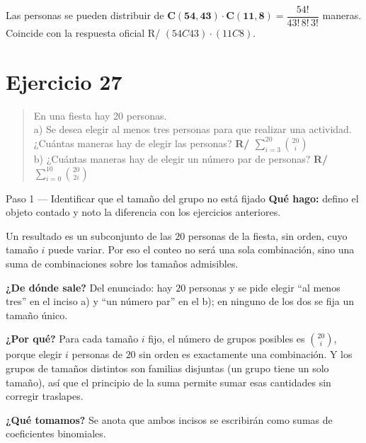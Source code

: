 \documentclass[11pt]{article}
\begin{document}
\begin{resp}
Las personas se pueden distribuir de $\mathbf{C(54,43)\cdot C(11,8)}=\dfrac{54!}{43!\,8!\,3!}$ maneras. Coincide con la respuesta oficial R/ $(54C43)\cdot(11C8)$.
\end{resp}

\section*{Ejercicio 27}

\begin{quote}
En una fiesta hay 20 personas.\\[2pt]
a) Se desea elegir al menos tres personas para que realizar una actividad. ¿Cuántas maneras hay de elegir las personas? \quad \textbf{R/ $\displaystyle\sum_{i=3}^{20}\binom{20}{i}$}\\
b) ¿Cuántas maneras hay de elegir un número par de personas? \quad \textbf{R/ $\displaystyle\sum_{i=0}^{10}\binom{20}{2i}$}
\end{quote}

\begin{paso}{Paso 1 --- Identificar que el tamaño del grupo no está fijado}
\textbf{Qué hago:} defino el objeto contado y noto la diferencia con los ejercicios anteriores.

Un resultado es un subconjunto de las $20$ personas de la fiesta, sin orden, cuyo tamaño $i$ puede variar. Por eso el conteo no será una sola combinación, sino una suma de combinaciones sobre los tamaños admisibles.

\textbf{¿De dónde sale?} Del enunciado: hay $20$ personas y se pide elegir ``al menos tres'' en el inciso a) y ``un número par'' en el b); en ninguno de los dos se fija un tamaño único.

\textbf{¿Por qué?} Para cada tamaño $i$ fijo, el número de grupos posibles es $\binom{20}{i}$, porque elegir $i$ personas de $20$ sin orden es exactamente una combinación. Y los grupos de tamaños distintos son familias disjuntas (un grupo tiene un solo tamaño), así que el principio de la suma permite sumar esas cantidades sin corregir traslapes.

\textbf{¿Qué tomamos?} Se anota que ambos incisos se escribirán como sumas de coeficientes binomiales.
\end{paso}
\end{document}

